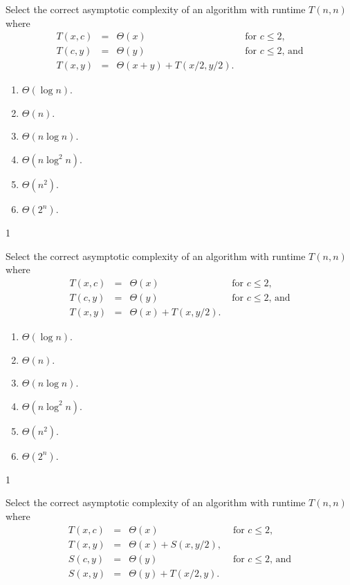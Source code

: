 \documentclass[12pt,twoside]{article}
\begin{document}
\begin{problems}
\begin{problemparts}

\problempart {}
Select the correct asymptotic complexity
of an algorithm with runtime $T(n, n)$
where
$$
\begin{array}{rcll}
T(x, c) &=& \Theta(x) & \textrm{ for $c \le 2$}, \\
T(c, y) &=& \Theta(y) & \textrm{ for $c \le 2$, and} \\
T(x, y) &=& \Theta(x + y) + T(x / 2, y / 2).
\end{array}
$$

\begin{enumerate}
\item $\Theta(\log n)$.
\item $\Theta(n)$.
\item $\Theta(n \log n)$.
\item $\Theta(n \log^2 n)$.
\item $\Theta(n^2)$.
\item $\Theta(2^n)$.
\end{enumerate}

\ifsolution \solution{}
1
\fi

\problempart {}
Select the correct asymptotic complexity
of an algorithm with runtime $T(n, n)$
where
$$
\begin{array}{rcll}
T(x, c) &=& \Theta(x) & \textrm{ for $c \le 2$}, \\
T(c, y) &=& \Theta(y) & \textrm{ for $c \le 2$, and} \\
T(x, y) &=& \Theta(x) + T(x, y / 2).
\end{array}
$$

\begin{enumerate}
\item $\Theta(\log n)$.
\item $\Theta(n)$.
\item $\Theta(n \log n)$.
\item $\Theta(n \log^2 n)$.
\item $\Theta(n^2)$.
\item $\Theta(2^n)$.
\end{enumerate}

\ifsolution \solution{}
1
\fi

\problempart {}
Select the correct asymptotic complexity
of an algorithm with runtime $T(n, n)$
where
$$
\begin{array}{rcll}
T(x, c) &=& \Theta(x) & \textrm{ for $c \le 2$}, \\
T(x, y) &=& \Theta(x) + S(x, y / 2), \\
S(c, y) &=& \Theta(y) & \textrm{ for $c \le 2$, and} \\
S(x, y) &=& \Theta(y) + T(x / 2, y).
\end{array}
$$


\end{problemparts}
\end{problems}
\end{document}
